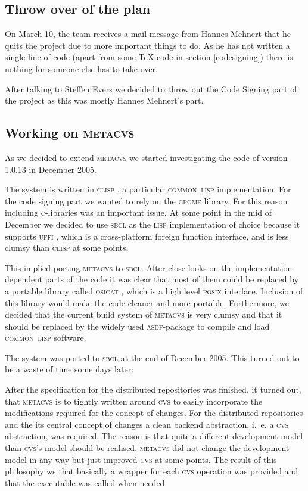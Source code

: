 \documentclass[fleqn, 10pt, a4paper]{report} \usepackage{amssymb}
\begin{document}
\subsection{Throw over of the plan}

On March 10, the team receives a mail message from Hannes Mehnert that he
quits the project due to more important things to do. As he has not written
a single line of code (apart from some \TeX-code in section \ref{codesigning})
there is nothing for someone else has to take over.

After talking to Steffen Evers we decided to throw out the Code Signing
part of the project as this was mostly Hannes Mehnert's part.

\subsection{Working on \textsc{metacvs}}

As we decided to extend \textsc{metacvs} we started investigating the
code of version 1.0.13 in December 2005.

The system is written in \textsc{clisp} \cite{Clis06}, a particular
\textsc{common~lisp} implementation. For the code signing part we
wanted to rely on the \textsc{gpgme} \cite{Gnup06} library. For this reason
including \textsc{c}-libraries was an important issue. At some point
in the mid of December we decided to use \textsc{sbcl} \cite{Sbcl06} as the
\textsc{lisp} implementation of choice because it supports
\textsc{uffi} \cite{Uffi06},
which is a cross-platform foreign function interface,
and is less clumsy than \textsc{clisp} at some points.

This implied porting \textsc{metacvs} to \textsc{sbcl}. After close
looks on the implementation dependent parts of the code it was clear
that most of them could be replaced by a portable library called
\textsc{osicat} \cite{Osic06}, which is a high level \textsc{posix} interface.
Inclusion of this library would make the code cleaner and more
portable. Furthermore, we decided that the current build system of
\textsc{metacvs} is very clumsy and that it should be replaced by the
widely used \textsc{asdf}-package \cite{Asdf06} to compile and load
\textsc{common~lisp} software.

The system was ported to \textsc{sbcl} at the end of December 2005.
This turned out to be a waste of time some days later:

After the specification for the distributed repositories was finished,
it turned out, that \textsc{metacvs} is to tightly written around
\textsc{cvs} to easily incorporate the modifications required for the
concept of changes. For the distributed repositories and the its
central concept of changes a clean backend abstraction, i.~e. a
\textsc{cvs} abstraction, was required. The reason is that quite a
different development model than \textsc{cvs}'s model should be
realised. \textsc{metacvs} did not change the development model in any
way but just improved \textsc{cvs} at some points.  The result of this
philosophy ws that basically a wrapper for each \textsc{cvs} operation
was provided and that the executable was called when needed.
\end{document}
